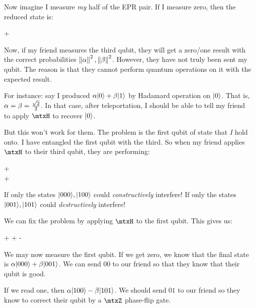 \begin{remark}
  Now imagine I measure \emph{my} half of the EPR pair. If I measure
  zero, then the reduced state is:

  \begin{nedqn}
    \alpha {} + \beta {}
  \end{nedqn}

  \noindent
  Now, if my friend measures the third qubit, they will get a zero/one
  result with the correct probabilities $\left\Vert \alpha \right\Vert^2,
  \left\Vert \beta \right\Vert^2$. However, they have not truly been sent my qubit. The
  reason is that they cannot perform quantum operations on it with the
  expected result.

  For instance: say I produced $\alpha |0\rangle + \beta |1\rangle$ by Hadamard
  operation on $|0\rangle$. That is, $\alpha = \beta = \frac{\sqrt{2}}{2}$. In that
  case, after teleportation, I should be able to tell my friend to apply
  $\mtxH$ to recover $|0\rangle$.

  But this won't work for them. The problem is the first qubit of state
  that \emph{I} hold onto. I have entangled the first qubit with the
  third. So when my friend applies $\mtxH$ to their third qubit, they
  are performing:

  \begin{nedqn}
    \parens{\mtxI \otimes \mtxI \otimes \mtxH}
    \parens{\sqtot \zzzket + \sqtot \ozoket}
  \eqcol
    \parens{
      \sqtot \zzket
      \otimes
      \mtxH \zket
    }
    +
    \parens{
      \sqtot \ozket
      \otimes
      \mtxH \oket
    }
  \\
  \eqcol
    \half
    \parens{\zzzket + \zzoket}
    +
    \half
    \parens{\ozzket - \ozoket}
  \end{nedqn}

  \noindent
  If only the states $|000\rangle, |100\rangle$ could \emph{constructively}
  interfere! If only the states $|001\rangle, |101\rangle$ could
  \emph{destructively} interfere!
\end{remark}

\begin{remark}
  We can fix the problem by applying $\mtxH$ to the first qubit. This
  gives us:

  \begin{nedqn}
    \parens{
      \mtxH \otimes \mtxI \otimes \mtxI
    }
    \parens{
      \alpha \zzzket + \beta \ozoket
    }
  \eqcol
    \alpha \sqtot \zzzket
    + \alpha \sqtot \ozzket
    + \beta \sqtot \zzoket
    - \beta \sqtot \ozoket
  \end{nedqn}

  We may now measure the first qubit. If we get zero, we know that the
  final state is $\alpha |000\rangle + \beta |001\rangle$. We can send $00$ to
  our friend so that they know that their qubit is good.

  If we read one, then $\alpha |100\rangle - \beta |101\rangle$. We should send
  $01$ to our friend so they know to correct their qubit by a $\mtxZ$
  phase-flip gate.
\end{remark}

